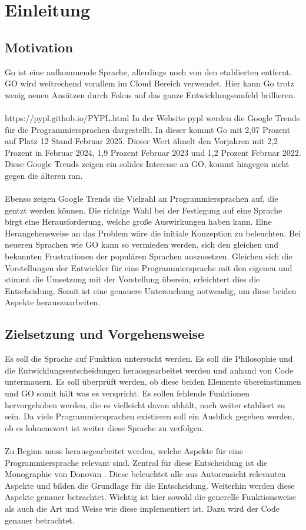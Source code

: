 \chapter{Einleitung}\label{ch:intro}

\section{Motivation}
Go ist eine aufkommende Sprache, allerdings noch von den etablierten entfernt. GO wird weitrechend vorallem im Cloud Bereich verwendet. Hier kann Go trotz wenig neuen Ansätzen durch Fokus auf das ganze Entwicklungsumfeld brillieren.\cite{cox_go_2022}
\\\\ https://pypl.github.io/PYPL.html In der Website pypl werden die Google Trends für die Programmiersprachen dargestellt. In dieser kommt Go mit 2,07 Prozent auf Platz 12 Stand Februar 2025. Dieser Wert ähnelt den Vorjahren mit 2,2 Prozent in Februar 2024, 1,9 Prozent Februar 2023 und 1,2 Prozent Februar 2022. Diese Google Trends zeigen ein solides Interesse an GO, kommt hingegen nicht gegen die älteren ran.
\\\\ Ebenso zeigen Google Trends die Vielzahl an Programmiersprachen auf, die gentzt werden können. Die richtige Wahl bei der Festlegung auf eine Sprache birgt eine Herausforderung, welche große Auswirkungen haben kann. Eine Herangehensweise an das Problem wäre die initiale Konzeption zu beleuchten. Bei neueren Sprachen wie GO kann so vermieden werden, sich den gleichen und bekannten Frustrationen der populären Sprachen auszusetzen. Gleichen sich die Vorstellungen der Entwickler für eine Programmiersprache mit den eigenen und stimmt die Umsetzung mit der Vorstellung überein, erleichtert dies die Entscheidung. Somit ist eine genauere Untersuchung notwendig, um diese beiden Aspekte herauszuarbeiten. 

\section{Zielsetzung und Vorgehensweise}
Es soll die Sprache auf Funktion untersucht werden. Es soll die Philosophie und die Entwicklungsentscheidungen herausgearbeitet werden und anhand von Code untermauern. Es soll überprüft werden, ob diese beiden Elemente übereinstimmen und GO somit hält was es verspricht. Es sollen fehlende Funktionen hervorgehoben werden, die es vielleicht davon abhält, noch weiter etabliert zu sein. Da viele Programmiersprachen existieren soll ein Ausblick gegeben werden, ob es lohnenswert ist weiter diese Sprache zu verfolgen.
\\\\
Zu Beginn muss herausgearbeitet werden, welche Aspekte für eine Programmiersprache relevant sind. Zentral für diese Entscheidung ist die Monographie von Donovan \cite{donovan_go_2016}. Diese beleuchtet alle aus Autorensicht relevanten Aspekte und bilden die Grundlage für die Entscheidung. Weiterhin werden diese Aspekte genauer betrachtet. Wichtig ist hier sowohl die generelle Funktionsweise als auch die Art und Weise wie diese implementiert ist. Dazu wird der Code genauer betrachtet.
